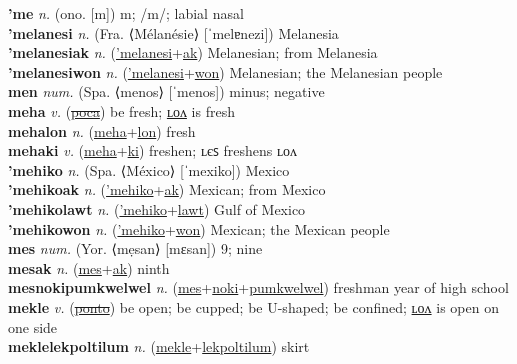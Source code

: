 \textbf{'me} \textit{n.} (ono. [m])
m; /m/; labial nasal \label{'me} \\
\textbf{'melanesi} \textit{n.} (Fra. ⟨Mélanésie⟩ [ˈmelɐnezi])
Melanesia \label{'melanesi} \\
\textbf{'melanesiak} \textit{n.} (\hyperref['melanesi]{'melanesi}+\hyperref[ak]{ak})
Melanesian; from Melanesia \label{'melanesiak} \\
\textbf{'melanesiwon} \textit{n.} (\hyperref['melanesi]{'melanesi}+\hyperref[won]{won})
Melanesian; the Melanesian people \label{'melanesiwon} \\
\textbf{men} \textit{num.} (Spa. ⟨menos⟩ [ˈmenos])
minus; negative \label{men} \\
\textbf{meha} \textit{v.} (\hyperref[poca]{\sout{poca}})
be fresh; \hyperref[mehalon]{ʟᴏᴧ} is fresh \label{meha} \\
\textbf{mehalon} \textit{n.} (\hyperref[meha]{meha}+\hyperref[lon]{lon})
fresh \label{mehalon} \\
\textbf{mehaki} \textit{v.} (\hyperref[meha]{meha}+\hyperref[ki]{ki})
freshen; ʟєꜱ freshens ʟᴏᴧ \label{mehaki} \\
\textbf{'mehiko} \textit{n.} (Spa. ⟨México⟩ [ˈmexiko])
Mexico \label{'mehiko} \\
\textbf{'mehikoak} \textit{n.} (\hyperref['mehiko]{'mehiko}+\hyperref[ak]{ak})
Mexican; from Mexico \label{'mehikoak} \\
\textbf{'mehikolawt} \textit{n.} (\hyperref['mehiko]{'mehiko}+\hyperref[lawt]{lawt})
Gulf of Mexico \label{'mehikolawt} \\
\textbf{'mehikowon} \textit{n.} (\hyperref['mehiko]{'mehiko}+\hyperref[won]{won})
Mexican; the Mexican people \label{'mehikowon} \\
\textbf{mes} \textit{num.} (Yor. ⟨mẹsan⟩ [mɛsan])
9; nine \label{mes} \\
\textbf{mesak} \textit{n.} (\hyperref[mes]{mes}+\hyperref[ak]{ak})
ninth \label{mesak} \\
\textbf{mesnokipumkwelwel} \textit{n.} (\hyperref[mes]{mes}+\hyperref[noki]{noki}+\hyperref[pumkwelwel]{pumkwelwel})
freshman year of high school \label{mesnokipumkwelwel} \\
\textbf{mekle} \textit{v.} (\hyperref[ponto]{\sout{ponto}})
be open; be cupped; be U-shaped; be confined; \hyperref[meklelon]{ʟᴏᴧ} is open on one side \label{mekle} \\
\textbf{meklelekpoltilum} \textit{n.} (\hyperref[mekle]{mekle}+\hyperref[lekpoltilum]{lekpoltilum})
skirt \label{meklelekpoltilum} \\
